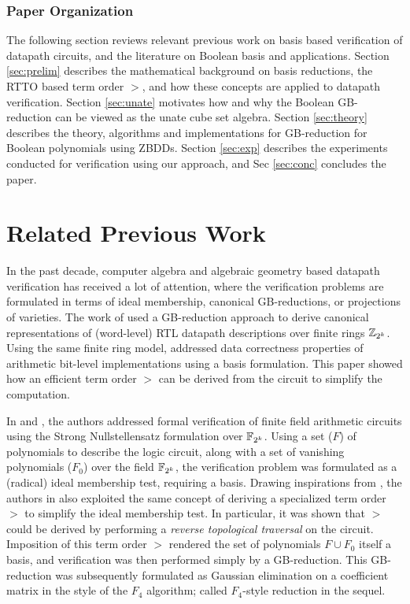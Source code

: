 \subsubsection{Paper Organization} The following section reviews
relevant previous work on \Grobner basis based verification of
datapath circuits, and the literature on Boolean \Grobner basis and
applications. Section \ref{sec:prelim} describes the mathematical
background on \Grobner basis reductions, the RTTO based term order
$>$, and how these concepts are applied to datapath
verification. Section \ref{sec:unate} motivates how and why the
Boolean GB-reduction can be viewed as the unate cube set
algebra. Section \ref{sec:theory} describes the theory, algorithms and
implementations for GB-reduction for Boolean polynomials using
ZBDDs. Section \ref{sec:exp} describes the experiments conducted for
verification using our approach, and Sec \ref{sec:conc} concludes the
paper. 


\section{Related Previous Work}
\label{sec:prev}

In the past decade, computer algebra and algebraic geometry based
datapath verification has received a lot of attention, where the
verification problems are formulated in terms of ideal membership,
canonical GB-reductions, or projections of
varieties. The work of \cite{iccad05} used a GB-reduction
approach to derive canonical representations of (word-level) RTL
datapath descriptions over finite rings ${\mathbb{Z}}_{2^k}$. Using the same finite
ring model, \cite{wienand:cav08} addressed data correctness properties
of arithmetic bit-level implementations using a \Grobner basis
formulation. This paper showed how an efficient term order $>$
can be derived from the circuit to simplify the computation. 


In
\cite{lv:date2012} and \cite{lv:tcad2013}, the authors addressed formal
verification of finite field arithmetic circuits using the Strong
Nullstellensatz formulation over ${\mathbb{F}}_{2^k}$. Using a set ($F$) of
polynomials to describe the logic circuit, along with a set of
vanishing polynomials ($F_0$) over the field ${\mathbb{F}}_{2^k}$, the verification
problem was formulated as a (radical) ideal membership test, requiring 
a \Grobner basis. Drawing inspirations from \cite{wienand:cav08},
the authors in \cite{lv:date2012} also exploited the same concept of deriving a
specialized term order $>$ to simplify the ideal membership test. In
particular, it was shown that $>$ could be derived by performing a
{\it reverse topological traversal} on the circuit. Imposition of this
term order $>$ rendered the set of polynomials $F\cup F_0$ itself a
\Grobner basis, and verification was then performed simply by a
GB-reduction. This GB-reduction was 
subsequently formulated as Gaussian elimination on a coefficient
matrix \cite{lv:tcad2013,pruss:tcad} in the style of the $F_4$
algorithm; called $F_4$-style reduction in the sequel. 

